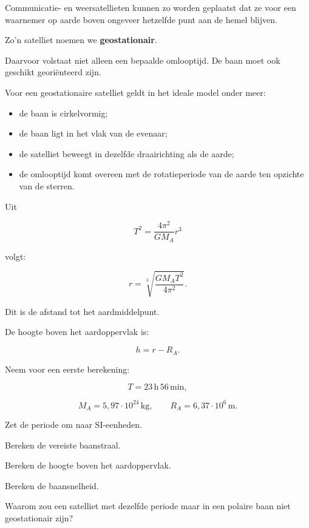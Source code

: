 \documentclass{ximera}
\begin{document}


Communicatie- en weersatellieten kunnen zo worden geplaatst dat ze voor
een waarnemer op aarde boven ongeveer hetzelfde punt aan de hemel
blijven.

Zo'n satelliet noemen we \textbf{geostationair}.

Daarvoor volstaat niet alleen een bepaalde omlooptijd. De baan moet ook
geschikt georiënteerd zijn.

Voor een geostationaire satelliet geldt in het ideale model onder meer:

\begin{itemize}
  \item de baan is cirkelvormig;
  \item de baan ligt in het vlak van de evenaar;
  \item de satelliet beweegt in dezelfde draairichting als de aarde;
  \item de omlooptijd komt overeen met de rotatieperiode van de aarde
        ten opzichte van de sterren.
\end{itemize}

Uit

\[
T^2=\frac{4\pi^2}{GM_A}r^3
\]

volgt:

\[
\boxed{
r
=
\sqrt[3]{\frac{GM_AT^2}{4\pi^2}}.
}
\]

Dit is de afstand tot het aardmiddelpunt.

De hoogte boven het aardoppervlak is:

\[
\boxed{
h=r-R_A.
}
\]


\begin{oefening}{\oefU\ESS}

Neem voor een eerste berekening:

\[
T=23\,\mathrm h\,56\,\mathrm{min},
\]

\[
M_A=5{,}97\cdot10^{24}\,\mathrm{kg},
\qquad
R_A=6{,}37\cdot10^6\,\mathrm m.
\]

\begin{question}
Zet de periode om naar SI-eenheden.
\end{question}

\begin{question}
Bereken de vereiste baanstraal.
\end{question}

\begin{question}
Bereken de hoogte boven het aardoppervlak.
\end{question}

\begin{question}
Bereken de baansnelheid.
\end{question}

\begin{question}
Waarom zou een satelliet met dezelfde periode maar in een polaire baan
niet geostationair zijn?
\end{question}

\end{oefening}
\end{document}
